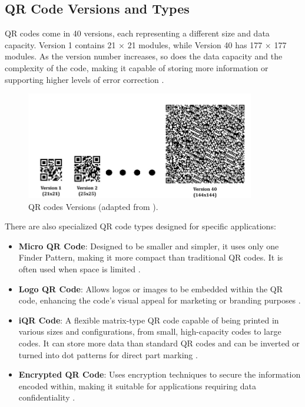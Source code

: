 \subsection{QR Code Versions and Types}
QR codes come in 40 versions, each representing a different size and data capacity. Version 1 contains 21 × 21 modules, while Version 40 has 177 × 177 modules. As the version number increases, so does the data capacity and the complexity of the code, making it capable of storing more information or supporting higher levels of error correction \cite{Tiwari2016}. 

\begin{figure}[h]
	\centering
	\includegraphics[width=10cm]{assets/ch2/qr_versions}
	\caption{QR codes Versions (adapted from \cite{Tiwari2016}).}
	\label{QR_versions}
\end{figure}


There are also specialized QR code types designed for specific applications:

\begin{itemize}
	\item \textbf{Micro QR Code}: Designed to be smaller and simpler, it uses only one Finder Pattern, making it more compact than traditional QR codes. It is often used when space is limited \cite{Tiwari2016}.
	\item \textbf{Logo QR Code}: Allows logos or images to be embedded within the QR code, enhancing the code's visual appeal for marketing or branding purposes \cite{Tiwari2016}.
	\item \textbf{iQR Code}: A flexible matrix-type QR code capable of being printed in various sizes and configurations, from small, high-capacity codes to large codes. It can store more data than standard QR codes and can be inverted or turned into dot patterns for direct part marking \cite{Tiwari2016}.
	\item \textbf{Encrypted QR Code}: Uses encryption techniques to secure the information encoded within, making it suitable for applications requiring data confidentiality \cite{Tiwari2016}.
\end{itemize}

